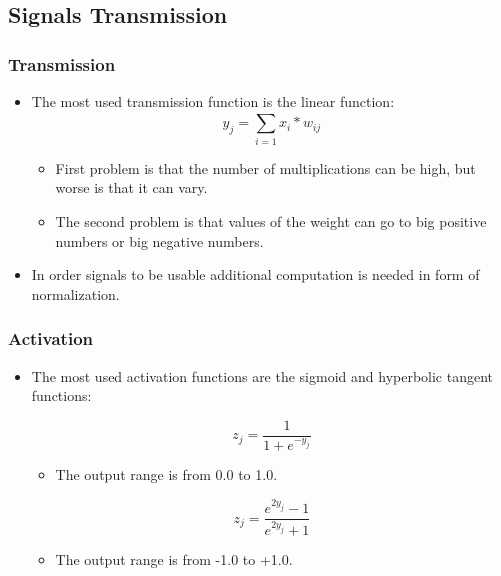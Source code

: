\documentclass{beamer}
\begin{document}
\subsection{Signals Transmission}

\begin{frame}
\frametitle{Transmission}
\begin{itemize}
  \item The most used transmission function is the linear function:
  \begin{equation}
  \label{equation01}
  y_{j} = \sum_{i=1}^{} x_{i}*w_{ij}
  \end{equation}
  \begin{itemize}
    \item First problem is that the number of multiplications can be high, but worse is that it can vary.
    \item The second problem is that values of the weight can go to big positive numbers or big negative numbers.
  \end{itemize}
  \item In order signals to be usable additional computation is needed in form of normalization. 
\end{itemize}
\end{frame}

\begin{frame}
\frametitle{Activation}
\begin{itemize}
  \item The most used activation functions are the sigmoid and hyperbolic tangent functions:

  \begin{equation}
  \label{equation02}
  z_{j} = \frac{1}{1 + e^{-y_{j}}}
  \end{equation}
  \begin{itemize}
    \item The output range is from 0.0 to 1.0.
  \end{itemize}
  
  \begin{equation}
  \label{equation03}
  z_{j} = \frac{e^{2y_{j}}-1}{e^{2y_{j}}+1}
  \end{equation}
  \begin{itemize}
    \item The output range is from -1.0 to +1.0.
  \end{itemize}
\end{itemize}
\end{frame}
\end{document}
